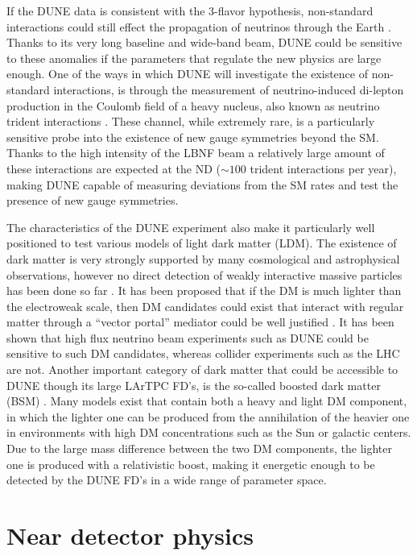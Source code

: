 If the DUNE data is consistent with the 3-flavor hypothesis, non-standard interactions could still effect the propagation of neutrinos through the Earth \cite{Farzan:2017xzy}. Thanks to its very long baseline and wide-band beam, DUNE could be sensitive to these anomalies if the parameters that regulate the new physics are large enough. One of the ways in which DUNE will investigate the existence of non-standard interactions, is through the measurement of  neutrino-induced di-lepton production in the Coulomb field of a heavy nucleus, also known as neutrino trident interactions \cite{Altmannshofer:2019zhy}. These channel, while extremely rare, is a particularly sensitive probe into the existence of new gauge symmetries beyond the SM. Thanks to the high intensity of the LBNF beam a relatively large amount of these interactions are expected at the ND ($\sim 100$ trident interactions per year), making DUNE capable of measuring deviations from the SM rates and test the presence of new gauge symmetries.

The characteristics of the DUNE experiment also make it particularly well positioned to test various models of light dark matter (LDM). The existence of dark matter is very strongly supported by many cosmological and astrophysical observations, however no direct detection of weakly interactive massive particles has been done so far \cite{Planck:2018vyg}. It has been proposed that if the DM is much lighter than the electroweak scale, then DM candidates could exist that interact with regular matter through a \enquote{vector portal} mediator could be well justified \cite{Battaglieri:2017aum}. It has been shown that high flux neutrino beam experiments such as DUNE could be sensitive to such DM candidates, whereas collider experiments such as the LHC are not. Another important category of dark matter that could be accessible to DUNE though its large LArTPC FD's, is the so-called boosted dark matter (BSM) \cite{Agashe:2014yua}. Many models exist that contain both a heavy and light DM component, in which the lighter one can be produced from the annihilation of the heavier one in environments with high DM concentrations such as the Sun or galactic centers. Due to the large mass difference between the two DM components, the lighter one is produced with a relativistic boost, making it energetic enough to be detected by the DUNE FD's in a wide range of parameter space.

\section{Near detector physics}
\label{Sec:NDScientific}

